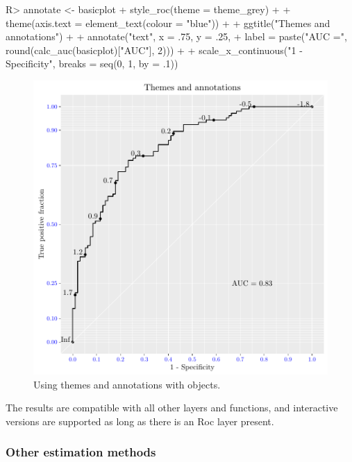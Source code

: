 \documentclass[codesnippet]{jss}
\begin{document}
\begin{Schunk}
\begin{Sinput}
R> annotate <- basicplot + style_roc(theme = theme_grey) +
+   theme(axis.text = element_text(colour = "blue")) +
+   ggtitle("Themes and annotations") + 
+   annotate("text", x = .75, y = .25, 
+            label = paste("AUC =", round(calc_auc(basicplot)["AUC"], 2))) +
+   scale_x_continuous("1 - Specificity", breaks = seq(0, 1, by = .1))
\end{Sinput}
\end{Schunk}

\begin{Schunk}
\begin{figure}
\includegraphics{figure/print2-1} \caption{Using  themes and annotations with  objects. \label{annotate}}\label{fig:print2}
\end{figure}
\end{Schunk}

The results are compatible with all other  layers and
functions, and interactive versions are supported as long as there is an
Roc layer present.

\subsubsection{Other estimation methods}\label{other-estimation-methods}
\end{document}
